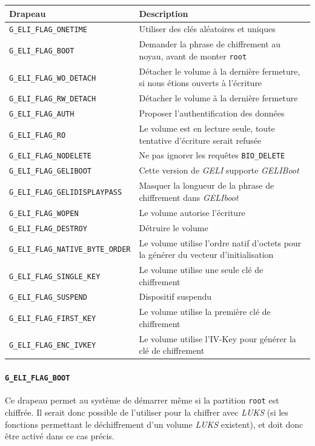 \begin{tabularx}{\linewidth}{ | l | X | }
  \hline
  \textbf{Drapeau}                            & \textbf{Description} \\
  \hline
  \texttt{G\_ELI\_FLAG\_ONETIME}             & Utiliser des clés aléatoires et
  uniques \\
  \texttt{G\_ELI\_FLAG\_BOOT}                & Demander la phrase de
  chiffrement au noyau, avant de monter \texttt{root} \\
  \texttt{G\_ELI\_FLAG\_WO\_DETACH}          & Détacher le volume à la dernière
  fermeture, si nous étions ouverts à l'écriture \\
  \texttt{G\_ELI\_FLAG\_RW\_DETACH}          & Détacher le volume à la dernière
  fermeture \\
  \texttt{G\_ELI\_FLAG\_AUTH}                & Proposer l'authentification des
  données \\
  \texttt{G\_ELI\_FLAG\_RO}                  & Le volume est en lecture seule,
  toute tentative d'écriture serait refusée \\
  \texttt{G\_ELI\_FLAG\_NODELETE}            & Ne pas ignorer les requêtes
  \texttt{BIO\_DELETE} \\
  \texttt{G\_ELI\_FLAG\_GELIBOOT}           & Cette version de \textit{GELI}
  supporte \textit{GELIBoot} \\
  \texttt{G\_ELI\_FLAG\_GELIDISPLAYPASS}    & Masquer la longueur de la phrase
  de chiffrement dans \textit{GELIboot} \\
  \texttt{G\_ELI\_FLAG\_WOPEN}               & Le volume autorise l'écriture \\
  \texttt{G\_ELI\_FLAG\_DESTROY}             & Détruire le volume \\
  \texttt{G\_ELI\_FLAG\_NATIVE\_BYTE\_ORDER} & Le volume utilise l'ordre natif
  d'octets pour la générer du vecteur d'initialisation \\
  \texttt{G\_ELI\_FLAG\_SINGLE\_KEY}         & Le volume utilise une seule clé
  de chiffrement \\
  \texttt{G\_ELI\_FLAG\_SUSPEND}             & Dispositif suspendu \\
  \texttt{G\_ELI\_FLAG\_FIRST\_KEY}          & Le volume utilise la première
  clé de chiffrement \\
  \texttt{G\_ELI\_FLAG\_ENC\_IVKEY}          & Le volume utilise l'IV-Key pour
  générer la clé de chiffrement \\
  \hline
\end{tabularx}
\paragraph{\texttt{G\_ELI\_FLAG\_BOOT}}
Ce drapeau permet au système de démarrer même si la partition \texttt{root} est
chiffrée. Il serait donc possible de l'utiliser pour la chiffrer avec
\textit{LUKS} (si les fonctions permettant le déchiffrement d'un volume
\textit{LUKS} existent), et doit donc être activé dans ce cas précis.
